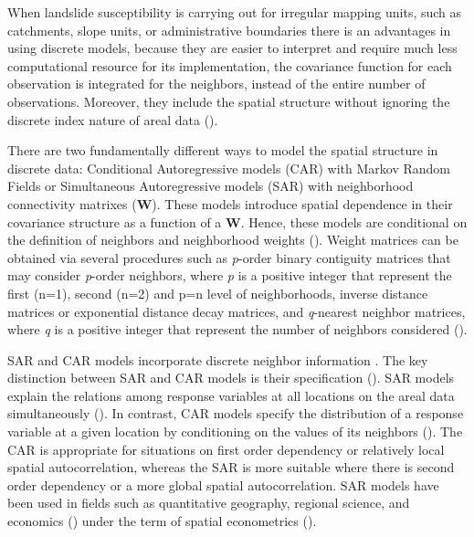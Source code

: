 \documentclass[
  manuscript=article,  
  layout=preprint,  
  year=2023,
  volume=0,
]{format}
\begin{document}
\par When landslide susceptibility is carrying out for irregular mapping units, such as catchments, slope units, or administrative boundaries there is an advantages in using discrete models, because they are easier to interpret and require much less computational resource for its implementation, the covariance function for each observation is integrated for the neighbors, instead of the entire number of observations. Moreover, they include the spatial structure without ignoring the discrete index nature of areal data (\cite{fischer2011spatial, fotheringham2000quantitative}).

\par There are two fundamentally different ways to model the spatial structure in discrete data: Conditional Autoregressive models (CAR) with Markov Random Fields or Simultaneous Autoregressive models (SAR) with neighborhood connectivity matrixes (\textbf{W}).  These models introduce spatial dependence in their covariance structure as a function of a \textbf{W}. Hence, these models are conditional on the definition of neighbors and neighborhood weights (\cite{anselin1996simple}). Weight matrices can be obtained via several procedures such as \textit{p}-order binary contiguity matrices that may consider \textit{p}-order neighbors, where \textit{p} is a positive integer that represent the first (n=1), second (n=2) and p=n level of neighborhoods, inverse distance matrices or exponential distance decay matrices, and \textit{q}-nearest neighbor matrices, where \textit{q} is a positive integer that represent the number of neighbors considered (\cite{getis2009spatial, stakhovych2009specification}).

\par SAR and CAR models incorporate discrete neighbor information \cite{wall2004close, jaya2021spatial}. The key distinction between SAR and CAR models is their specification (\cite{cressie2015statistics}). SAR models explain the relations among response variables at all locations on the areal data simultaneously (\cite{ver2018spatial,jaya2021spatial}). In contrast, CAR models specify the distribution of a response variable at a given location by conditioning on the values of its neighbors (\cite{anselin1988spatial}). The CAR is appropriate for situations on first order dependency or relatively local spatial autocorrelation, whereas the SAR is more suitable where there is second order dependency or a more global spatial autocorrelation. SAR models have been used in fields such as quantitative geography, regional science, and economics (\cite{math9111276}) under the term of spatial econometrics (\cite{anselin1988spatial, arbia2016spatial}).
\end{document}
